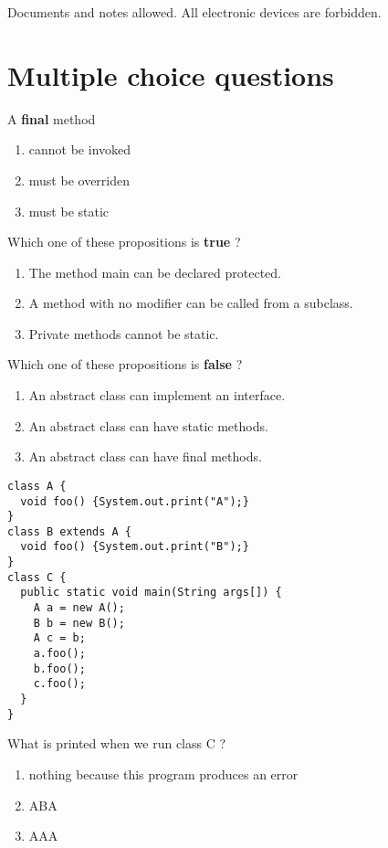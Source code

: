 \documentclass[correction]{exercices}
\begin{document}

Documents and notes allowed. All electronic devices are forbidden.

\section{Multiple choice questions }

\begin{question}
A \textbf{final} method 
\begin{enumerate}
\item cannot be invoked 
\item must be overriden
\item must be static
\end{enumerate}
\end{question}

\begin{question}
Which one of these propositions is \textbf{true} ?
\begin{enumerate}
\item The method main can be declared protected. 
\item A method with no modifier can be called from a subclass.
\item Private methods cannot be static.
\end{enumerate}
\end{question}

\begin{question}
Which one of these propositions is \textbf{false} ?
\begin{enumerate}
\item An abstract class can implement an interface.
\item An abstract class can have static methods.
\item An abstract class can have final methods.
\end{enumerate}
\end{question}

\begin{question}
\hfill

\begin{lstlisting}
class A {
  void foo() {System.out.print("A");}
}
class B extends A {
  void foo() {System.out.print("B");}
}
class C {
  public static void main(String args[]) {
    A a = new A();
    B b = new B();
    A c = b;
    a.foo();
    b.foo();
    c.foo();
  }
}
\end{lstlisting}

What is printed when we run class C ?
\begin{enumerate}
\item nothing because this program produces an error
\item ABA
\item AAA
\end{enumerate}
\end{question}
\end{document}
